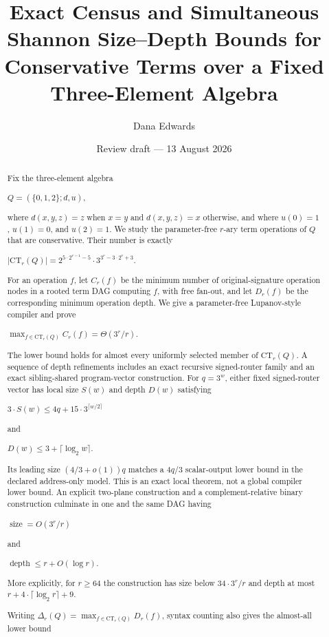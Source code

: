 \documentclass[
  11pt,
]{article}
\title{Exact Census and Simultaneous Shannon Size--Depth Bounds for
Conservative Terms over a Fixed Three-Element Algebra}
\author{Dana Edwards}
\date{Review draft --- 13 August 2026}
\theoremstyle{definition}
\theoremstyle{remark}
\begin{document}
\maketitle
\begin{abstract}
Fix the three-element algebra

\(Q=(\{0,1,2\};d,u)\),

where \(d(x,y,z)=z\) when \(x=y\) and \(d(x,y,z)=x\) otherwise, and
where \(u(0)=1\), \(u(1)=0\), and \(u(2)=1\). We study the
parameter-free \(r\)-ary term operations of \(Q\) that are conservative.
Their number is exactly

\(|\mathrm{CT}_r(Q)| = 2^{5\mathbin{\cdot}2^{r-1}-5} \mathbin{\cdot} 3^{3^r-3\mathbin{\cdot}2^r+3}\).

For an operation \(f\), let \(C_r(f)\) be the minimum number of
original-signature operation nodes in a rooted term DAG computing \(f\),
with free fan-out, and let \(D_r(f)\) be the corresponding minimum
operation depth. We give a parameter-free Lupanov-style compiler and
prove

\(\max_{f \in \mathrm{CT}_r(Q)} C_r(f) = \Theta(3^r/r)\).

The lower bound holds for almost every uniformly selected member of
\(\mathrm{CT}_r(Q)\). A sequence of depth refinements includes an exact
recursive signed-router family and an exact sibling-shared
program-vector construction. For \(q=3^w\), either fixed signed-router
vector has local size \(S(w)\) and depth \(D(w)\) satisfying

\(3\mathbin{\cdot}S(w) \le  4q+15\mathbin{\cdot}3^{\lceil w/2 \rceil}\)

and

\(D(w) \le  3+\lceil \log_2 w \rceil\).

Its leading size \((4/3+o(1))q\) matches a \(4q/3\) scalar-output lower
bound in the declared address-only model. This is an exact local
theorem, not a global compiler lower bound. An explicit two-plane
construction and a complement-relative binary construction culminate in
one and the same DAG having

\(\operatorname{size}=O(3^r/r)\)

and

\(\operatorname{depth} \le  r+O(\log r)\).

More explicitly, for \(r\ge 64\) the construction has size below
\(34\mathbin{\cdot}3^r/r\) and depth at most
\(r+4\mathbin{\cdot}\lceil \log_2 r \rceil+9\).

Writing \(\Delta_r(Q)=\max_{f \in \mathrm{CT}_r(Q)} D_r(f)\), syntax
counting also gives the almost-all lower bound


\end{abstract}
\end{document}
